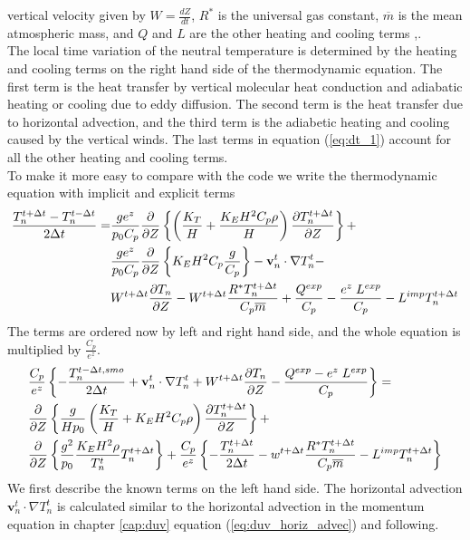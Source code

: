 vertical velocity given by $W = \frac{dZ}{dt}$, $R^*$ is the
universal gas constant, $\overline{m}$ is the mean atmospheric mass,
and $Q$
and $L$ are the other heating and cooling terms
\cite{roble1995},\cite{roble1987b}. \\
%
The local time variation of the neutral temperature is determined by
the heating and cooling terms on the right hand side of the
thermodynamic equation. The first term is the heat transfer by
vertical molecular heat conduction and adiabatic heating or cooling
due to eddy diffusion. The second term is the heat transfer due to
horizontal advection, and the third term is the adiabetic heating
and cooling caused by the vertical winds. The last terms in equation 
(\ref{eq:dt_1}) account
for all the other heating and cooling terms. \\

%
To make it more easy to compare with the code we write the
thermodynamic equation with implicit and explicit terms
%
\begin{align}
  \frac{T_n^{t+\Delta t}- T_n^{t- \Delta t}}{2 \Delta t} =&
   \frac{g e^z}{p_0 C_p}\frac{\partial}{\partial Z}
  \left\{ \left( \frac{K_T}{H} + \frac{K_E H^2 C_p \rho}{H} \right)
  \frac{\partial T_n^{t+\Delta t}}{\partial Z}\right\} + \notag \\
  {}& \frac{g e^z}{p_0 C_p}\frac{\partial}{\partial Z}
  \left\{K_E H^2 C_p
   \frac{g}{C_p}\right\} - \mathbf{v}_n^t\cdot \nabla T_n^t - \\
   {}& W^{t+\Delta t}\frac{\partial T_n}{\partial Z}
    - W^{t+\Delta t}\frac{R^* T_n^{t+\Delta t}}{C_p \overline{m}}
    + \frac{Q^{exp}}{C_p}- \frac{e^z \; L^{exp}}{C_p}- L^{imp} T_n^{t + \Delta t}
    \notag
\end{align}
%
The terms are ordered now by left and right hand side, and the whole
equation is multiplied by $\frac{C_p}{e^z}$.
%
\begin{align}
  & \frac{C_p}{e^z} \left\{ -\frac{T_n^{t- \Delta t,smo}}{2 \Delta t} +
  \mathbf{v}_n^t\cdot \nabla T_n^t + W^{t+\Delta t}\frac{\partial T_n}{\partial Z}
  - \frac{Q^{exp}-e^z \; L^{exp}}{C_p} \right\} = \notag \\
  & \frac{\partial}{\partial Z} \left\{
  \frac{g}{H p_0} \left( \frac{K_T}{H} + K_E H^2 C_p \rho \right)
  \frac{\partial T_n^{t+\Delta t}}{\partial Z}
  \right\} + \\
  & \frac{\partial}{\partial Z} \left\{ \frac{g^2}{p_0}\frac{K_E H^2 \rho}
  {T_n^t} T_n^{t+\Delta t} \right\}
  + \frac{C_p}{e^z}\left\{ - \frac{T_n^{t+ \Delta t}}{2 \Delta t} - w^{t+\Delta t}
  \frac{R^* T_n^{t+\Delta t}}{C_p \overline{m}} - L^{imp} T_n^{t + \Delta t}
\right\} \notag
\end{align}
%
We first describe the known terms on the left hand side. The
horizontal advection $\mathbf{v}_n^t\cdot \nabla T_n^t$ is
calculated similar to the horizontal advection in the momentum
equation in chapter \ref{cap:duv} equation
(\ref{eq:duv_horiz_advec})
and following. \\

